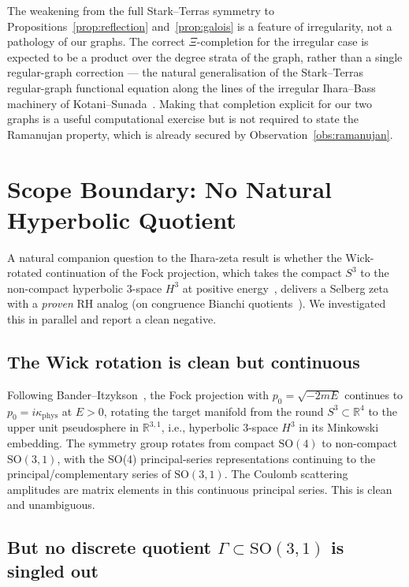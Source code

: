 \documentclass[11pt]{article}
\begin{document}
The weakening from the full Stark--Terras symmetry to
Propositions~\ref{prop:reflection} and~\ref{prop:galois} is a feature
of irregularity, not a pathology of our graphs.  The correct $\Xi$-completion for the
irregular case is expected to be a product over the degree strata of
the graph, rather than a single regular-graph correction --- the
natural generalisation of the Stark--Terras regular-graph functional
equation along the lines of the irregular Ihara--Bass machinery of
Kotani--Sunada~\cite{kotani2000}.  Making that completion explicit for
our two graphs is a useful computational exercise but is not required
to state the Ramanujan property, which is already secured by
Observation~\ref{obs:ramanujan}.

\section{Scope Boundary: No Natural Hyperbolic Quotient}
\label{sec:scope_boundary}

A natural companion question to the Ihara-zeta result is whether the
Wick-rotated continuation of the Fock projection, which takes the
compact $S^3$ to the non-compact hyperbolic 3-space $H^3$ at positive
energy~\cite{bander1966}, delivers a Selberg zeta with a \emph{proven}
RH analog (on congruence Bianchi quotients~\cite{egm1998}).  We
investigated this in parallel and report a clean negative.

\subsection{The Wick rotation is clean but continuous}

Following Bander--Itzykson~\cite{bander1966}, the Fock projection with
$p_0=\sqrt{-2mE}$ continues to $p_0=i\kappa_{\mathrm{phys}}$ at
$E>0$, rotating the target manifold from the round $S^3\subset
\mathbb{R}^4$ to the upper unit pseudosphere in $\mathbb{R}^{3,1}$,
i.e., hyperbolic 3-space $H^3$ in its Minkowski embedding.  The
symmetry group rotates from compact $\mathrm{SO}(4)$ to non-compact
$\mathrm{SO}(3,1)$, with the SO(4) principal-series
representations continuing to the principal/complementary series of
$\mathrm{SO}(3,1)$.  The Coulomb scattering amplitudes are matrix
elements in this continuous principal series.  This is clean and
unambiguous.

\subsection{But no discrete quotient $\Gamma\subset\mathrm{SO}(3,1)$
is singled out}
\end{document}
